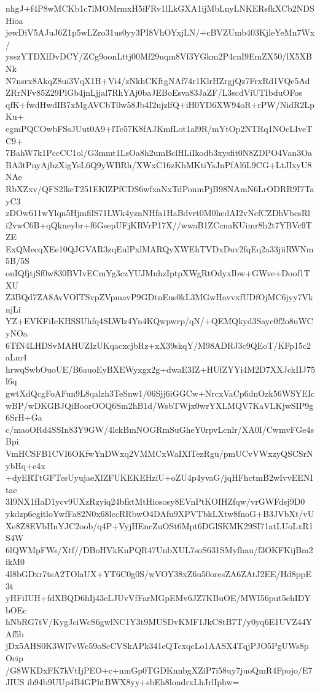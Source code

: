 nhgJ+f4P8wMCKb1c7lMOMrmxH5iFRv1lLkGXA1ijMbLnyLNKERsfkXCb2NDSHioa
jewDiV5AJuJ6Z1p5wLZro31us0yy3PI8VhOYxjLN/+cBVZUmb403KjleYeMn7Wx/
ysszYTDXlDvDCY/ZCg9oonLttj00Mf29uqm8Vf3YGkm2P4cnI9EmZX50/lX5XBNk
N7nsrx8AkqZ8ui3VqX1H+Vi4/zNkhCKftgNAf74r1KlrHZrgjQz7FrxRd1VQe5Ad
ZRrNFv85Z29PlGb4jnLjjal7RhYAj0baJEBoEsva83JaZF/L3scdViUTIbduOFos
qfK+fwdHwdIB7xMgAVCbT0w58Jb4I2ujzlfQ+iH0YD6XW94oR+rPW/NidR2LpKu+
egmPQCOwbFSsJUut0A9+lTe57K8fAJKmfLot1al9R/mYtOp2NTRq1NOcLIveTC9+
7BahW7k1PccCC1ol/G3mmt1LsOa8h2umBclHLiIkodb3xysfit0N8ZDPO4Van3Oa
BA3tPnyAjbzXigYsL6Q9yWBRh/XWxC16zKhMKtiYsJnPfAl6L9CG+LtJIxyU8NAe
RbXZxv/QFS2lkeT251EKlZPfCDS6wfxaNxTdPonmPjB98NAmN6LrODRR9I7TayC3
zDOw611wYlqn5HjmfilS71LWk4yznNHfa1HaBdvrt0M0hedAI2vNefCZDhVbcsRl
i2vwC6B+qQkneybr+f6GsepUFjKRVrP17X//wwaB1ZCcnaKUimr8h2t7YBVc9TZE
ExQMecqXEe10QJGVAR3zqEulPxlMARQyXWEhTVDxDuv2fqEq2a33jiiRWNm5B/5S
onIQfjtjSf0w830BVIvECmYg3czYUJMnhzIptpXWgRtOdyxIbw+GWve+Doof1TXU
Z3BQd7ZA8AvVOITSvpZVpmavP9GDtnEus0kL3MGwHavvxfUDfOjMC6jyy7VknjLi
YZ+EVKFiIeKHSSUhfq4SLWlz4Yn4KQwpwrp/qN/+QEMQkyd3Sayc0f2o8uWCyNOa
6TfN4LHDSvMAHUZIzUKqacxcjbRz+xX39skqY/M98ADRJ3c9QEoT/KFp15c2aLm4
hrwqSwbOuoUE/B6auoEyBXEWyxgx2g+dwaE3IZ+HUfZYYi4M2D7XXJckIIJ75l6q
gwtXdQcgFoAFun9L8qalzh3TeSnw1/06Sjj6iGGCw+NrcxVaCp6dnOzk56WSYEIc
wBP/wDKGBJQiBoorOOQ6Sm2hB1d/WsbTWjx0wrYXLMQV7KaVLKjwSIP9g6SrH+Ga
c/maoORd4SSIn83Y9GW/4lckBmNOGRmSuGheY0rpvLcnlr/XA0I/CwmvFGe4sBpi
VmHCSFB1CVI6OKfwYnDWxq2VMMCxWaIXlTezRgu/pmUCvVWxzyQSCSrNybHq+e4x
+dyERTtGFTcsUyujaeXlZFUKEKEHziU+oZU4p4yvaG/jqHFhctmB2wIvvEENItae
3I9NX1fIaD1ycv9UXzRzyiq24bfktMtHiososy8EVnPtKOIHZfqw/vrGWFdsj9D0
ykdzp6egitloYwfFa82N0x68lccRRbwO4DAfu9XPVTbkLXtw8fnoG+B3JVbXt/vU
Xe8Z8EVbHnYJC2oob/q4P+VyjHEncZuOSt6Mpt6DGlSKMK29SI71atLUoLxR1S4W
6lQWMpFWs/Xtf//DBoHVkKnPQR47UnbXUL7soS631SMyfhau/f3OKFKijBm2ikM0
4l8bGDxr7tsA2TOlaUX+YT6C0g0S/wVOY38xZ6u50oresZA6ZAtJ2EE/Hd8ppE3t
yHFiIUH+fdXBQD6hIj43eLJUvVfFarMGpEMv6JZ7KBuOE/MWI56put5ehIDYbOEc
hNbRG7tV/KygJciWcS6gwlNC1Y3t9MUSDvKMF1JkC8tB7T/y0yq6E1UVZ44YAf5b
jDx5AHS0K3Wl7vWc59oScCVSkAPk341eQTcxqcLo1AASX4TqjPJO5PgUWs8pOcip
/G8WKDxFK7kVtIjPEO+c+nmGp0TGDKnnbgXZiP7i58uy7juoQmR4Fpojo/E7JIUS
ib94b9UUp4B4GPhtBWX8yy+sbEh8londrxLhJrlIphw=

